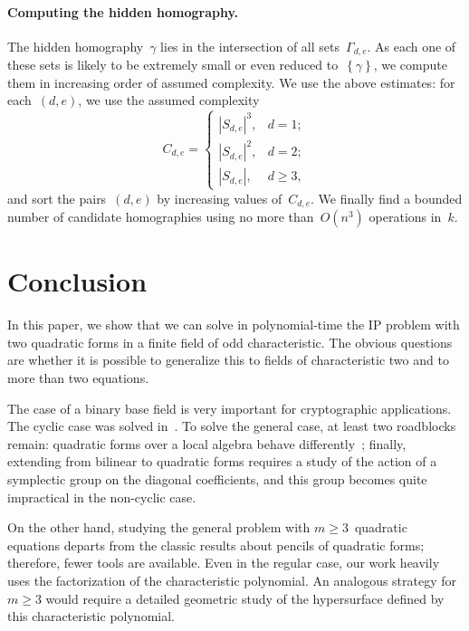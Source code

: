 \documentclass{lms}
\def\acco#1{\left\{#1\right\}}
\def\abs#1{\left|#1\right|}
\def\card#1{\abs{#1}}
\begin{document}
\paragraph{Computing the hidden homography.}

The hidden homography~$γ$ lies in the intersection of all sets~$Γ_{d,e}$.
As each one of these sets is likely to be extremely small or even reduced
to~$\acco{γ}$, we compute them in increasing order of assumed complexity.
We use the above estimates: for each~$(d,e)$, we use the assumed complexity
\begin{equation}
C_{d,e} = \begin{cases}
\card{S_{d,e}}^3,& d = 1;\\
\card{S_{d,e}}^2,& d = 2;\\
\card{S_{d,e}},& d≥ 3,
\end{cases}
\end{equation}
and sort the pairs~$(d,e)$ by increasing values of~$C_{d,e}$. We finally
find a bounded number of candidate homographies using no more
than~$O(n^3)$ operations in~$k$.

\section*{Conclusion}

In this paper, we show that we can solve in polynomial-time the IP
problem with two quadratic forms in a finite field of odd characteristic.
The obvious questions are whether it is possible to generalize this to
fields of characteristic two and to more than two equations.

The case of a binary base field is very important for cryptographic
applications. The cyclic case was solved in~\cite{MPG2013}. To solve
the general case, at least two roadblocks remain:
quadratic
forms over a local algebra behave differently~\cite[§93]{omeara};
finally, extending from bilinear to quadratic forms requires a study of
the action of a symplectic group on the diagonal coefficients, and this
group becomes quite impractical in the non-cyclic case.

On the other hand, studying the general problem with $m ≥ 3$~quadratic
equations departs from the classic results about pencils of quadratic
forms; therefore, fewer tools are available. Even in the regular
case, our work heavily uses the factorization of the characteristic
polynomial. An analogous strategy for~$m ≥ 3$ would require a detailed
geometric study of the hypersurface defined by this characteristic
polynomial.
\end{document}
